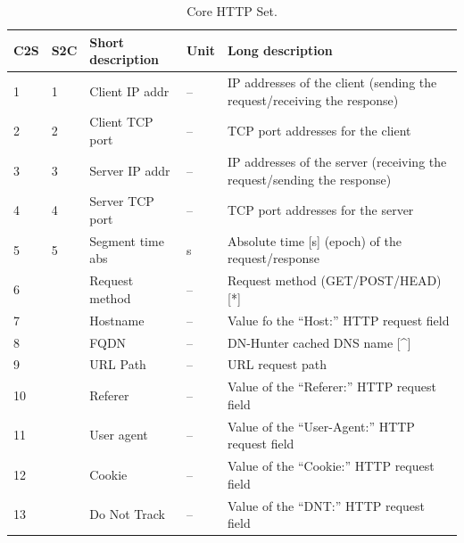 \documentclass[a4paper,10pt]{article}
\newcommand{\TableFont}{\footnotesize}
\begin{document}
\begin{table}[tp]
	\caption{Core HTTP Set.}\label{tab:TStathttp}
	\TableFont{
	\begin{center}
		\begin{tabular*}{1\textwidth}{|l|l|l|l|p{}}
			\toprule
			\cellcolor{PalePink}\textbf{C2S}		& \cellcolor{LightGreen}\textbf{S2C} & \cellcolor{BrightYellow}\textbf{Short description} & \cellcolor{BrightYellow}\textbf{Unit}	& \cellcolor{BrightYellow}\textbf{Long description}\\ \midrule
			\cellcolor{PalePink}1					& \cellcolor{LightGreen}1			& Client IP addr	& --	& IP addresses of the client (sending the request/receiving the response) \\ \hline
			\cellcolor{PalePink}2					& \cellcolor{LightGreen}2			& Client TCP port	& --	& TCP port addresses for the client \\ \hline
			\cellcolor{PalePink}3					& \cellcolor{LightGreen}3			& Server IP addr	& --	& IP addresses of the server (receiving the request/sending the response) \\ \hline
			\cellcolor{PalePink}4					& \cellcolor{LightGreen}4			& Server TCP port	& --	& TCP port addresses for the server \\ \hline
			\cellcolor{PalePink}5					& \cellcolor{LightGreen}5			& Segment time abs	& \si{s}& Absolute time [s] (epoch) of the request/response \\ \hline
			\cellcolor{PalePink}6					& 									& Request method	& --	& Request method (GET/POST/HEAD) [*] \\ \hline
			\cellcolor{PalePink}7					& 									& Hostname			& --	& Value fo the ``Host:'' HTTP request field \\ \hline
			\cellcolor{PalePink}8					& 									& FQDN				& --	& DN-Hunter cached DNS name [\^{}] \\ \hline
			\cellcolor{PalePink}9					& 									& URL Path			& --	& URL request path \\ \hline
			\cellcolor{PalePink}10					& 									& Referer			& --	& Value of the ``Referer:'' HTTP request field \\ \hline
			\cellcolor{PalePink}11					& 									& User agent		& --	& Value of the ``User-Agent:'' HTTP request field \\ \hline
			\cellcolor{PalePink}12					& 									& Cookie			& --	& Value of the ``Cookie:'' HTTP request field \\ \hline
			\cellcolor{PalePink}13					& 									& Do Not Track		& --	& Value of the ``DNT:'' HTTP request field \\ \hline

\end{tabular*}
\end{center}}
\end{table}
\end{document}
